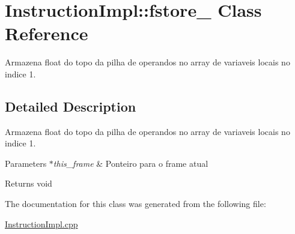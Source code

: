 \hypertarget{class_instruction_impl_1_1fstore__1}{}\section{Instruction\+Impl\+:\+:fstore\+\_ Class Reference}
\label{class_instruction_impl_1_1fstore__1}


Armazena float do topo da pilha de operandos no array de variaveis locais no indice 1.  




\subsection{Detailed Description}
Armazena float do topo da pilha de operandos no array de variaveis locais no indice 1. 


\begin{DoxyParams}{Parameters}
{\em $\ast$this\+\_\+frame} & Ponteiro para o frame atual \\
\hline
\end{DoxyParams}
\begin{DoxyReturn}{Returns}
void 
\end{DoxyReturn}


The documentation for this class was generated from the following file\+:\begin{DoxyCompactItemize}
\item 
\hyperlink{_instruction_impl_8cpp}{Instruction\+Impl.\+cpp}\end{DoxyCompactItemize}
